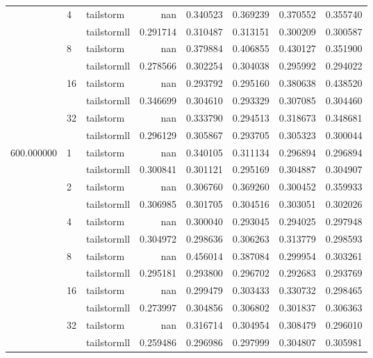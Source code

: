 \begin{tabular}{lllrrrrr}
 & \multirow[c]{2}{*}{4} & tailstorm & nan & 0.340523 & 0.369239 & 0.370552 & 0.355740 \\
 &  & tailstormll & 0.291714 & 0.310487 & 0.313151 & 0.300209 & 0.300587 \\
 & \multirow[c]{2}{*}{8} & tailstorm & nan & 0.379884 & 0.406855 & 0.430127 & 0.351900 \\
 &  & tailstormll & 0.278566 & 0.302254 & 0.304038 & 0.295992 & 0.294022 \\
 & \multirow[c]{2}{*}{16} & tailstorm & nan & 0.293792 & 0.295160 & 0.380638 & 0.438520 \\
 &  & tailstormll & 0.346699 & 0.304610 & 0.293329 & 0.307085 & 0.304460 \\
 & \multirow[c]{2}{*}{32} & tailstorm & nan & 0.333790 & 0.294513 & 0.318673 & 0.348681 \\
 &  & tailstormll & 0.296129 & 0.305867 & 0.293705 & 0.305323 & 0.300044 \\
\multirow[c]{12}{*}{600.000000} & \multirow[c]{2}{*}{1} & tailstorm & nan & 0.340105 & 0.311134 & 0.296894 & 0.296894 \\
 &  & tailstormll & 0.300841 & 0.301121 & 0.295169 & 0.304887 & 0.304907 \\
 & \multirow[c]{2}{*}{2} & tailstorm & nan & 0.306760 & 0.369260 & 0.300452 & 0.359933 \\
 &  & tailstormll & 0.306985 & 0.301705 & 0.304516 & 0.303051 & 0.302026 \\
 & \multirow[c]{2}{*}{4} & tailstorm & nan & 0.300040 & 0.293045 & 0.294025 & 0.297948 \\
 &  & tailstormll & 0.304972 & 0.298636 & 0.306263 & 0.313779 & 0.298593 \\
 & \multirow[c]{2}{*}{8} & tailstorm & nan & 0.456014 & 0.387084 & 0.299954 & 0.303261 \\
 &  & tailstormll & 0.295181 & 0.293800 & 0.296702 & 0.292683 & 0.293769 \\
 & \multirow[c]{2}{*}{16} & tailstorm & nan & 0.299479 & 0.303433 & 0.330732 & 0.298465 \\
 &  & tailstormll & 0.273997 & 0.304856 & 0.306802 & 0.301837 & 0.306363 \\
 & \multirow[c]{2}{*}{32} & tailstorm & nan & 0.316714 & 0.304954 & 0.308479 & 0.296010 \\
 &  & tailstormll & 0.259486 & 0.296986 & 0.297999 & 0.304807 & 0.305981 \\
\end{tabular}
